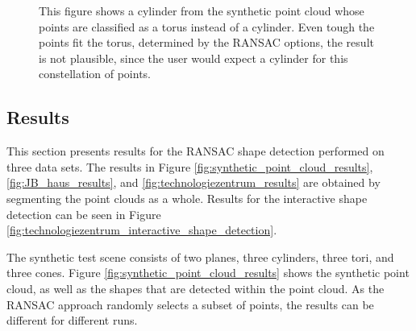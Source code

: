 \begin{figure}[h]
\centering
{}%
{}      
\caption[Implausible torus is detected instead of a more plausible cylinder. ]
{This figure shows a cylinder from the synthetic point cloud whose points are classified as a torus instead of a cylinder. Even tough the points fit the torus, determined by the RANSAC options, the result is not plausible, since the user would expect a cylinder for this constellation of points. }
\label{fig:missfittedTorus}
\end{figure}


\subsection{Results}

This section presents results for the RANSAC shape detection performed on three data sets. The results in Figure \ref{fig:synthetic_point_cloud_results}, \ref{fig:JB_haus_results}, and \ref{fig:technologiezentrum_results} are obtained by segmenting the point clouds as a whole. Results for the interactive shape detection can be seen in Figure \ref{fig:technologiezentrum_interactive_shape_detection}. 

The synthetic test scene consists of two planes, three cylinders, three tori, and three cones.  Figure \ref{fig:synthetic_point_cloud_results} shows the synthetic point cloud, as well as the shapes that are detected within the point cloud. As the RANSAC approach randomly selects a subset of points, the results can be different for different runs. 

